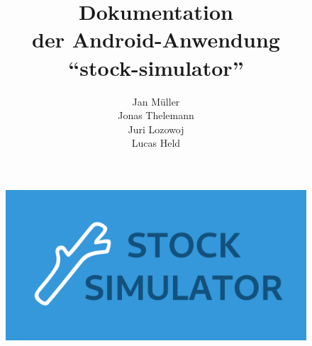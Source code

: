 \documentclass[a4paper]{article}
\begin{document}
\title{\textbf{Dokumentation\\der Android-Anwendung\\"`stock-simulator"'}}

\author{
    Jan Müller\\
    Jonas Thelemann\\
    Juri Lozowoj\\
    Lucas Held
}
\maketitle

\begin{figure}[H]
    \centering
    \includegraphics[width=\textwidth,keepaspectratio]{./images/stock-simulator-social.png}
\end{figure}

\pagebreak
\tableofcontents
\pagebreak
\end{document}
